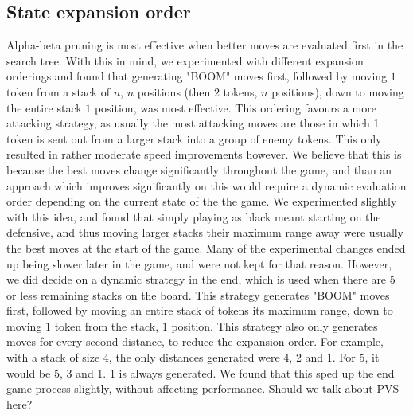 \documentclass[11pt]{article}
\newcommand{\drafting}[1]{\textcolor{OliveGreen}{#1}}
\begin{document}
\subsection{State expansion order}
Alpha-beta pruning is most effective when better moves are evaluated first in the search tree. With this in mind, we experimented with different expansion orderings and found that \drafting{generating "BOOM" moves first, followed by moving $1$ token from a stack of $n$, $n$ positions (then $2$ tokens, $n$ positions), down to moving the entire stack $1$ position,} was most effective. \drafting{This ordering favours a more attacking strategy, as usually the most attacking moves are those in which 1 token is sent out from a larger stack into a group of enemy tokens. } This only resulted in rather moderate speed improvements however. We believe that this is because the best moves change significantly throughout the game, and than an approach which improves significantly on this would require a dynamic evaluation order depending on the current state of the the game. \drafting{We experimented slightly with this idea, and found that simply playing as black meant starting on the defensive, and thus moving larger stacks their maximum range away were usually the best moves at the start of the game. Many of the experimental changes ended up being slower later in the game, and were not kept for that reason. However, we did decide on a dynamic strategy in the end, which is used when there are 5 or less remaining stacks on the board. This strategy generates "BOOM" moves first, followed by moving an entire stack of tokens its maximum range, down to moving $1$ token from the stack, $1$ position. This strategy also only generates moves for every second distance, to reduce the expansion order. For example, with a stack of size 4, the only distances generated were 4, 2 and 1. For 5, it would be 5, 3 and 1. 1 is always generated. We found that this sped up the end game process slightly, without affecting performance. }
Should we talk about PVS here?
\end{document}
